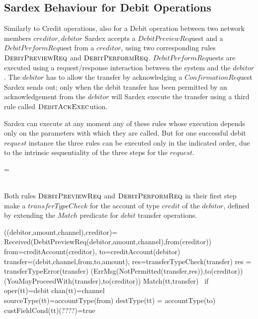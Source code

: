 \subsection{Sardex Behaviour for Debit Operations}
\label{sec:debitop}

Similarly to Credit operations, also for a Debit operation between two network members $creditor,debitor$ Sardex accepts a $DebitPreviewReq$uest and a  $DebitPerformReq$uest from a $creditor$, using two corresponding rules $\hbox{\sc DebitPreviewReq}$ and $\hbox{\sc DebitPerformReq}$.  $DebitPerformReq$uests are executed using a request/response interaction between the system and the $debitor$. The $debitor$ has to allow the transfer by acknowledging a $ConfirmationReq$uest Sardex sends out; only when the debit transfer has been permitted by an acknowledgement from the $debitor$ will Sardex execute the transfer using a third rule called $\hbox{\sc DebitAckExec}$ution. 

Sardex can execute at any moment any of these rules whose execution depends only on the parameters with which they are called. But for one successful debit $request$ instance the three rules can be executed only in the indicated order, due to the intrinsic sequentiality of the three steps for the $request$.

\begin{asm}
=\+
    \\
    \\
\end{asm}


Both rules $\hbox{\sc DebitPreviewReq}$ and $\hbox{\sc DebitPerformReq}$ in their first step make a $transferTypeCheck$ for the account of type $credit$ of the $debitor$, defined by extending the $Match$ predicate for $debit$ transfer operations. 

\begin{asm}
((debitor,amount,channel),creditor)=\+
  \IF Received(DebitPreviewReq(debitor,amount,channel),from(creditor)) \THEN \+  
    \LET from=creditAccount(creditor), to=creditAccount(debitor)\\
    \LET transfer=(debit,channel,from,to,amount), res=transferTypeCheck(transfer) \+
        \IF res = transferTypeError(transfer) \THEN \+                       (ErrMsg(NotPermitted(transfer,res)),to(creditor))\-
        \ELSE~ (YouMayProceedWith(transfer),to(creditor))\dec\-
\WHERE \+
  Match(tt,transfer) \mbox{ if } \+
        oper(tt)=debit \AND chan(tt)=channel \AND \\
        sourceType(tt)=accountType(from) \AND destType(tt) =  accountType(to) \AND \\ custFieldCond(tt)(????)=true
\end{asm}


